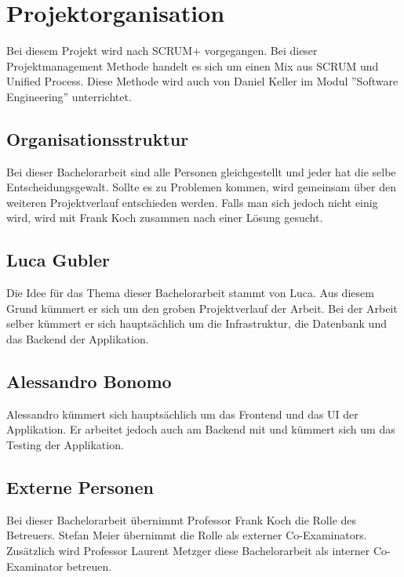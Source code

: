 \section{Projektorganisation}
Bei diesem Projekt wird nach SCRUM+ vorgegangen. Bei dieser Projektmanagement Methode handelt es sich um einen Mix aus SCRUM und Unified Process. Diese Methode wird auch von Daniel Keller im Modul ''Software Engineering'' unterrichtet.

\subsection{Organisationsstruktur}
Bei dieser Bachelorarbeit sind alle Personen gleichgestellt und jeder hat die selbe Entscheidungsgewalt. Sollte es zu Problemen kommen, wird gemeinsam über den weiteren Projektverlauf entschieden werden. Falls man sich jedoch nicht einig wird, wird mit Frank Koch zusammen nach einer Lösung gesucht.

\subsection*{Luca Gubler}
Die Idee für das Thema dieser Bachelorarbeit stammt von Luca. Aus diesem Grund kümmert er sich um den groben Projektverlauf der Arbeit. Bei der Arbeit selber kümmert er sich hauptsächlich um die Infrastruktur, die Datenbank und das Backend der Applikation.

\subsection*{Alessandro Bonomo}
Alessandro kümmert sich hauptsächlich um das Frontend und das UI der Applikation. Er arbeitet jedoch auch am Backend mit und kümmert sich um das Testing der Applikation.

\subsection*{Externe Personen}
Bei dieser Bachelorarbeit übernimmt Professor Frank Koch die Rolle des Betreuers. Stefan Meier übernimmt die Rolle als externer Co-Examinators. Zusätzlich wird Professor Laurent Metzger diese Bachelorarbeit als interner Co-Examinator betreuen.


\newpage